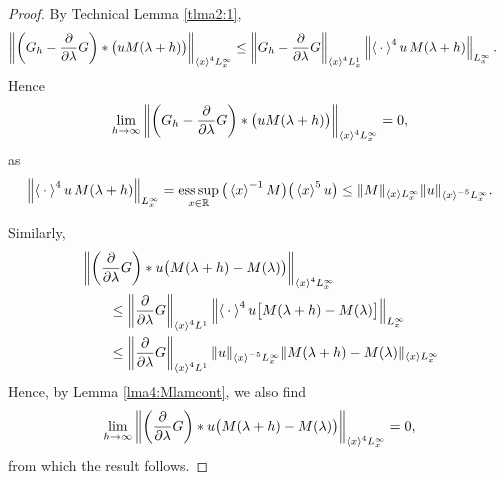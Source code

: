 \documentclass[../dissertation.tex]{subfiles}
\begin{document}
\begin{proof}
	By Technical Lemma \ref{tlma2:1}, 
	\begin{align*}
		\left\|
			\left(G_h - \frac{\partial}{\partial \lambda}G\right)
			* \big( uM(\lambda+h)\big)
		\right\|_{\left\langle x \right\rangle^4L_x^\infty}
			&\leq 
				\left\|
					G_h - \frac{\partial}{\partial \lambda}G
				\right\|_{\left\langle x \right\rangle^4 L_x^1}
				\left\|
					\left\langle \kern 0.5ex \cdot \kern 0.5ex \right\rangle^4
					u\,M(\lambda+h)
				\right\|_{L_x^\infty}.
	\end{align*}
	Hence
	\begin{align} \label{eq3:??}
		\lim_{h\to\infty} 
				\left\|
					\left(G_h - \frac{\partial}{\partial \lambda}G\right)
					* \big( uM(\lambda+h)\big)
				\right\|_{\left\langle x \right\rangle^4 L_x^\infty} 
			= 0,
	\end{align}
	as 
	\begin{align*}
		\left\|
			\left\langle \kern 0.5ex \cdot \kern 0.5ex \right\rangle^4
			u\,M(\lambda+h)
		\right\|_{L_x^\infty}
		=
			\operatorname*{ess\,sup}_{x\in\mathbb R} \big(\left\langle x \right\rangle^{-1} M\big) \big(\left\langle x \right\rangle^5 u\big)
		\leq \|M\|_{\left\langle x \right\rangle L_x^\infty} \|u\|_{\left\langle x \right\rangle^{-5}L_x^\infty}.
	\end{align*}

	Similarly, 
	\begin{align*}
		&
			\left\|
				\left(\frac{\partial}{\partial \lambda} G\right)
				*
				u\big(M(\lambda+h) - M(\lambda)\big)
			\right\|_{\left\langle x \right\rangle^4 L_x^\infty} \\
		&\qquad\leq
			\left\|
				\frac{\partial}{\partial \lambda} G
			\right\|_{\left\langle x \right\rangle^4 L^1}
			\left\|	
				\left\langle \kern 0.5ex \cdot \kern 0.5ex \right\rangle^4 u 
				\big[
					M(\lambda + h) - M(\lambda)
				\big]
			\right\|_{L_x^\infty} 
			\nonumber \\
		&\qquad\leq
			\left\|
				\frac{\partial}{\partial \lambda} G
			\right\|_{\left\langle x \right\rangle^4 L^1}
			\|u\|_{\left\langle x \right\rangle^{-5} L_x^\infty}
			\|M(\lambda+h) - M(\lambda)\|_{\left\langle x \right\rangle L_x^\infty}
			\nonumber
	\end{align*}
	Hence, by Lemma \ref{lma4:Mlamcont}, we also find
	\begin{align}
		\lim_{h\to\infty}
			\left\|
				\left(\frac{\partial}{\partial \lambda} G\right)
				*
				u\big(M(\lambda+h) - M(\lambda)\big)
			\right\|_{\left\langle x \right\rangle^4 L_x^\infty} 
			=0,
	\end{align}
	from which the result follows.
\end{proof}
\end{document}
